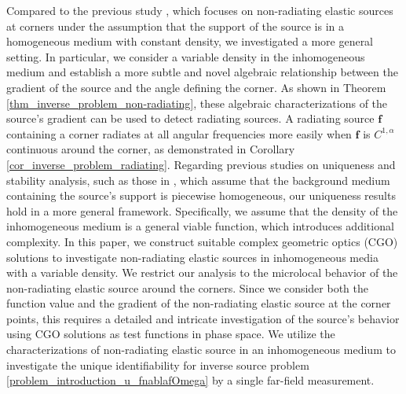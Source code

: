 \documentclass[11pt,reqno,oneside]{amsart}
\theoremstyle{definition}
\theoremstyle{remark}
\numberwithin{equation}{section}
\numberwithin{equation}{section}
\theoremstyle{remark}
\begin{document}
Compared to the previous study \cite{blaasten2018radiating}, which focuses on non-radiating elastic sources at corners under the assumption that the support of the source is in a homogeneous medium with constant density, we investigated a more general setting. In particular, we consider a variable density in the inhomogeneous medium and establish a more subtle and novel algebraic relationship between the gradient of the source and the angle defining the corner. As shown in Theorem \ref{thm_inverse_problem_non-radiating}, these algebraic characterizations of the source's gradient can be used to detect radiating sources. A radiating source $\mathbf{f}$ containing a corner radiates at all angular frequencies more easily when $\mathbf{f}$ is $C^{1,\alpha}$ continuous around the corner, as demonstrated in Corollary \ref{cor_inverse_problem_radiating}.   Regarding previous studies on uniqueness and stability analysis, such as those in \cite{blaasten2018radiating, zhai2023determination}, which assume that the background medium containing the source's support is piecewise homogeneous, our uniqueness results hold in a more general framework. Specifically, we assume that the density of the inhomogeneous medium is a general viable function, which introduces additional complexity. In this paper, we construct suitable complex geometric optics (CGO) solutions to investigate non-radiating elastic sources in inhomogeneous media with a variable density. We restrict our analysis to the microlocal behavior of the non-radiating elastic source around the corners. Since we consider both the function value and the gradient of the non-radiating elastic source at the corner points, this requires a detailed and intricate investigation of the source's behavior using CGO solutions as test functions in phase space. We utilize the characterizations of non-radiating elastic source in an inhomogeneous medium  to investigate the unique identifiability for inverse source problem \eqref{problem_introduction_u_fnablafOmega}  by a single far-field measurement.  
\end{document}

